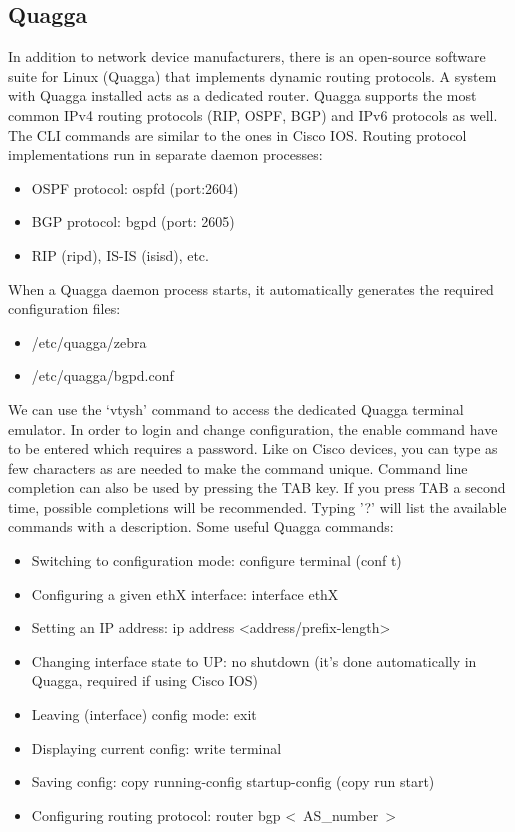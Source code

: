 \documentclass[a4paper]{article}
\begin{document}
\subsection{Quagga}
In addition to network device manufacturers, there is an open-source software suite for Linux (Quagga) that implements
dynamic routing protocols. A system with Quagga installed acts as a dedicated router. Quagga supports the most common
IPv4 routing protocols (RIP, OSPF, BGP) and IPv6 protocols as well. The CLI commands are similar to the ones in Cisco
IOS. Routing protocol implementations run in separate daemon processes:
\begin{itemize}
    \item OSPF protocol: ospfd (port:2604)
    \item BGP protocol: bgpd (port: 2605)
    \item RIP (ripd), IS-IS (isisd), etc.
\end{itemize}

When a Quagga daemon process starts, it automatically generates the required configuration files:

\begin{itemize}
    \item /etc/quagga/zebra
    \item /etc/quagga/bgpd.conf
\end{itemize}

We can use the `vtysh' command to access the dedicated Quagga terminal emulator. In order to login and change
configuration, the enable command have to be entered which requires a password. Like on Cisco devices, you can type as
few characters as are needed to make the command unique. Command line completion can also be used by pressing the TAB
key. If you press TAB a second time, possible completions will be recommended. Typing '?' will list the available
commands with a description.
Some useful Quagga commands:

\begin{itemize}
    \item Switching to configuration mode: configure terminal (conf t)
    \item Configuring a given ethX interface: interface ethX
    \item Setting an IP address: ip address <address/prefix-length>
    \item Changing interface state to UP: no shutdown (it's done automatically in Quagga, required if using Cisco IOS)
    \item Leaving (interface) config mode: exit
    \item Displaying current config: write terminal
    \item Saving config: copy running-config startup-config (copy run start)
    \item Configuring routing protocol: router bgp \textless~AS\_number~\textgreater
\end{itemize}
\end{document}
